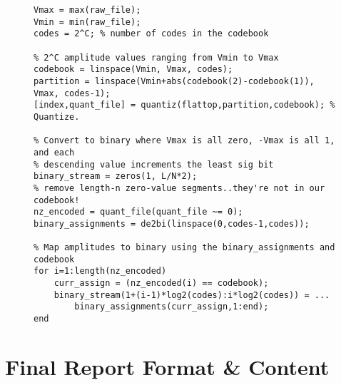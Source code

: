\documentclass[letterpaper,12pt]{article}
\begin{document}
\begin{figure}[h]
\centering
\begin{minipage}[framed]{0.9\textwidth}
\begin{lstlisting}
Vmax = max(raw_file);
Vmin = min(raw_file);
codes = 2^C; % number of codes in the codebook

% 2^C amplitude values ranging from Vmin to Vmax
codebook = linspace(Vmin, Vmax, codes);
partition = linspace(Vmin+abs(codebook(2)-codebook(1)), Vmax, codes-1);
[index,quant_file] = quantiz(flattop,partition,codebook); % Quantize.

% Convert to binary where Vmax is all zero, -Vmax is all 1, and each
% descending value increments the least sig bit
binary_stream = zeros(1, L/N*2);
% remove length-n zero-value segments..they're not in our codebook!
nz_encoded = quant_file(quant_file ~= 0);
binary_assignments = de2bi(linspace(0,codes-1,codes));

% Map amplitudes to binary using the binary_assignments and codebook
for i=1:length(nz_encoded)
    curr_assign = (nz_encoded(i) == codebook);
    binary_stream(1+(i-1)*log2(codes):i*log2(codes)) = ...
        binary_assignments(curr_assign,1:end);
end
\end{lstlisting}
\end{minipage}
\captionsetup{labelformat=empty}
\end{figure}









\section{Final Report Format \& Content}
\end{document}
